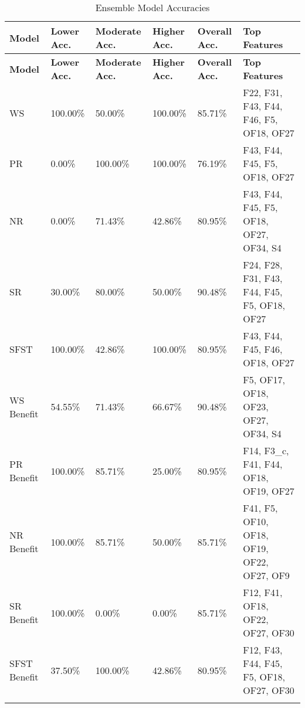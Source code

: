 \begin{longtable}{|p{1.5cm}|p{2.0cm}|p{2.0cm}|p{2.0cm}|p{2.0cm}|p{4cm}|}
\hline
\textbf{Model} & \textbf{Lower Acc.} & \textbf{Moderate Acc.} & \textbf{Higher Acc.} & \textbf{Overall Acc.} & \textbf{Top Features} \\ \hline
\endfirsthead
\hline
\textbf{Model} & \textbf{Lower Acc.} & \textbf{Moderate Acc.} & \textbf{Higher Acc.} & \textbf{Overall Acc.} & \textbf{Top Features} \\ \hline
\endhead

WS & 100.00\% & 50.00\% & 100.00\% & 85.71\% & F22, F31, F43, F44, F46, F5, OF18, OF27 \\ \hline
PR & 0.00\% & 100.00\% & 100.00\% & 76.19\% & F43, F44, F45, F5, OF18, OF27 \\ \hline
NR & 0.00\% & 71.43\% & 42.86\% & 80.95\% & F43, F44, F45, F5, OF18, OF27, OF34, S4 \\ \hline
SR & 30.00\% & 80.00\% & 50.00\% & 90.48\% & F24, F28, F31, F43, F44, F45, F5, OF18, OF27 \\ \hline
SFST & 100.00\% & 42.86\% & 100.00\% & 80.95\% & F43, F44, F45, F46, OF18, OF27 \\ \hline
WS Benefit & 54.55\% & 71.43\% & 66.67\% & 90.48\% & F5, OF17, OF18, OF23, OF27, OF34, S4 \\ \hline
PR Benefit & 100.00\% & 85.71\% & 25.00\% & 80.95\% & F14, F3\_c, F41, F44, OF18, OF19, OF27 \\ \hline
NR Benefit & 100.00\% & 85.71\% & 50.00\% & 85.71\% & F41, F5, OF10, OF18, OF19, OF22, OF27, OF9 \\ \hline
SR Benefit & 100.00\% & 0.00\% & 0.00\% & 85.71\% & F12, F41, OF18, OF22, OF27, OF30 \\ \hline
SFST Benefit & 37.50\% & 100.00\% & 42.86\% & 80.95\% & F12, F43, F44, F45, F5, OF18, OF27, OF30 \\ \hline
\caption{Ensemble Model Accuracies}
\label{tab:grouping_2d}
\end{longtable}

